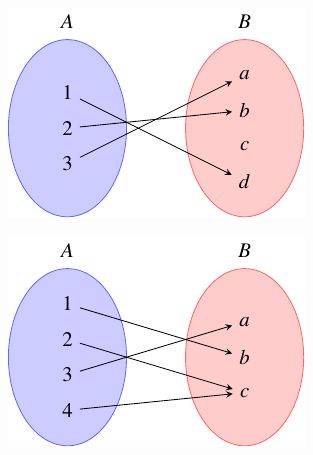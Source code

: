 \documentclass[
  a4paper,
]{scrreport}
\theoremstyle{definition}
\theoremstyle{plain}
\theoremstyle{definition}
\theoremstyle{definition}
\theoremstyle{plain}
\theoremstyle{plain}
\theoremstyle{remark}
\begin{document}
\begin{figure}

\begin{minipage}{0.50\linewidth}

\begin{figure}[H]

{\centering \includegraphics{./img/teoria-conjuntos/funcion-inyectiva.pdf}

}


\end{figure}%

\end{minipage}%
%
\begin{minipage}{0.50\linewidth}

\begin{figure}[H]

{\centering \includegraphics{./img/teoria-conjuntos/funcion-sobreyectiva.pdf}

}


\end{figure}%

\end{minipage}%
\newline
\begin{minipage}{0.50\linewidth}

\begin{figure}[H]


\end{figure}
\end{minipage}
\end{figure}
\end{document}

